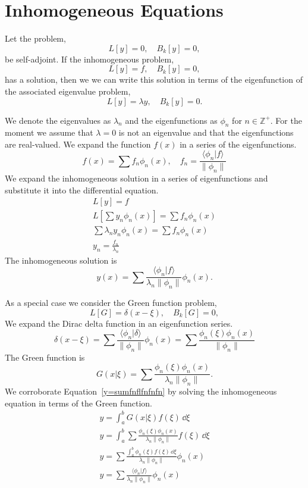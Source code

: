 \section{Inhomogeneous Equations}



Let the problem,
\[ 
L[y] = 0, \quad B_k[y] = 0,
\]
be self-adjoint.  If the inhomogeneous problem,
\[ 
L[y] = f, \quad B_k[y] = 0,
\]
has a solution, then we we can write this solution in terms of the 
eigenfunction of the associated eigenvalue problem,
\[ 
L[y] = \lambda y, \quad B_k[y] = 0.
\]


We denote the eigenvalues as $\lambda_n$ and the eigenfunctions as $\phi_n$ for 
$n \in \mathbb{Z}^+$.  For the moment we assume that $\lambda = 0$ is not an 
eigenvalue and that the eigenfunctions are real-valued.  We expand the 
function $f(x)$ in a series of the eigenfunctions.
\[
f(x) = \sum f_n \phi_n(x), \quad
f_n = \frac{ \langle \phi_n | f \rangle }{ \| \phi_n \| }
\]
We expand the inhomogeneous solution in a series of eigenfunctions and 
substitute it into the differential equation.
\begin{gather*}
  L[y] = f
  \\
  L \left[ \sum y_n \phi_n(x) \right] = \sum f_n \phi_n(x)
  \\
  \sum \lambda_n y_n \phi_n(x) = \sum f_n \phi_n(x)
  \\
  y_n = \frac{f_n}{\lambda_n}
\end{gather*}
The inhomogeneous solution is
\begin{equation}
  \label{y=sumfnflfnfnfn}
  y(x) = \sum \frac{ \langle \phi_n | f \rangle }{ \lambda_n \| \phi_n \| } \phi_n(x).
\end{equation}

As a special case we consider the Green function problem,
\[ 
L[G] = \delta(x - \xi), \quad B_k[G] = 0,
\]
We expand the Dirac delta function in an eigenfunction series.
\[
\delta(x - \xi) 
= \sum \frac{ \langle \phi_n | \delta \rangle }{ \| \phi_n \| } \phi_n(x)
= \sum \frac{ \phi_n(\xi) \phi_n(x) }{ \| \phi_n \| }
\]
The Green function is
\[
G(x|\xi) = \sum \frac{ \phi_n(\xi) \phi_n(x) }{ \lambda_n \| \phi_n \| }.
\]
We corroborate Equation~\ref{y=sumfnflfnfnfn} by solving the inhomogeneous 
equation in terms of the Green function.
\begin{gather*}
  y = \int_a^b G(x|\xi) f(\xi) \,\dd \xi
  \\
  y = \int_a^b \sum \frac{ \phi_n(\xi) \phi_n(x) }{ \lambda_n \| \phi_n \| } f(\xi) \,\dd \xi
  \\
  y = \sum \frac{ \int_a^b \phi_n(\xi) f(\xi) \,\dd \xi }{ \lambda_n \| \phi_n \| } \phi_n(x) 
  \\
  y = \sum \frac{ \langle \phi_n | f \rangle }{ \lambda_n \| \phi_n \| } \phi_n(x)
\end{gather*}











